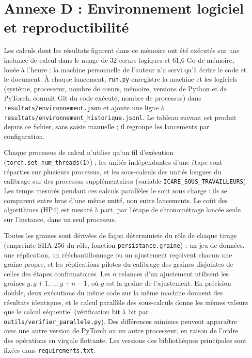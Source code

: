 \section*{Annexe D : Environnement logiciel et reproductibilité}
Les calculs dont les résultats figurent dans ce mémoire ont été exécutés sur une instance de calcul dans le nuage de 32 cœurs logiques et 61,6 Go de mémoire, louée à l'heure ; la machine personnelle de l'auteur n'a servi qu'à écrire le code et le document. À chaque lancement, \texttt{run.py} enregistre la machine et les logiciels (système, processeur, nombre de cœurs, mémoire, versions de Python et de PyTorch, commit Git du code exécuté, nombre de processus) dans \texttt{resultats/environnement.json} et ajoute une ligne à \texttt{resultats/environnement\_historique.jsonl}. Le tableau suivant est produit depuis ce fichier, sans saisie manuelle ; il regroupe les lancements par configuration.


Chaque processus de calcul n'utilise qu'un fil d'exécution (\texttt{torch.set\_num\_threads(1)}) ; les unités indépendantes d'une étape sont réparties sur plusieurs processus, et les sous-calculs des unités longues du calibrage sur des processus supplémentaires (variable \texttt{ICARE\_SOUS\_TRAVAILLEURS}). Les temps mesurés pendant ces calculs parallèles le sont sous charge : ils se comparent entre bras d'une même unité, non entre lancements. Le coût des algorithmes (HP4) est mesuré à part, par l'étape de chronométrage lancée seule sur l'instance, dans un seul processus.

Toutes les graines sont dérivées de façon déterministe du rôle de chaque tirage (empreinte SHA-256 du rôle, fonction \texttt{persistance.graine}) : un jeu de données, une réplication, un rééchantillonnage ou un ajustement reçoivent chacun une graine propre, et les réplications pilotes du calibrage des graines disjointes de celles des étapes confirmatoires. Les $n$ relances d'un ajustement utilisent les graines $g, g+1, \dots, g+n-1$, où $g$ est la graine de l'ajustement. En précision double, deux exécutions du même code sur la même machine donnent des résultats identiques, et le calcul parallèle des sous-calculs donne les mêmes valeurs que le calcul séquentiel (vérification bit à bit par \texttt{outils/verifier\_parallele.py}). Des différences minimes peuvent apparaître avec une autre version de PyTorch ou un autre processeur, en raison de l'ordre des opérations en virgule flottante. Les versions des bibliothèques principales sont fixées dans \texttt{requirements.txt}.

